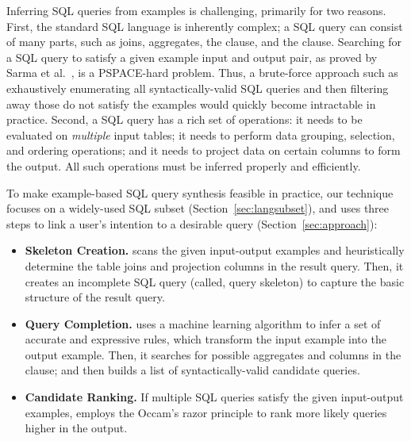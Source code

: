 Inferring SQL queries from examples is challenging,
primarily for two reasons. First, the standard SQL
language is inherently complex; a SQL query can consist
of many parts, such as joins, aggregates,
the  clause, and the  clause.
Searching for a SQL query
to satisfy a given example input and output pair,
as proved by Sarma et al.~\cite{DasSarma:2010},
is a PSPACE-hard problem. Thus,
a brute-force approach such as exhaustively
enumerating all
syntactically-valid SQL queries and then
filtering away those do not satisfy the examples
would quickly become intractable in practice. 
Second, a SQL query has a rich set of operations: it
needs to be evaluated on \textit{multiple} input tables;
it needs to perform data grouping, selection, and ordering
operations; and it needs to project data on certain columns to
form the output.
All such operations must be inferred properly and efficiently.%


To make example-based SQL query synthesis feasible in practice,
our \ourtool technique focuses on a widely-used SQL subset (Section~\ref{sec:langsubset}),
and uses three steps to link a user's intention to
a desirable query (Section~\ref{sec:approach}):



\begin{itemize}
\item \textbf{Skeleton Creation.} \ourtool scans the
given input-output examples and heuristically
determine the table joins and projection columns in
the result query. Then, it creates an
incomplete SQL query (called, query skeleton) to
capture the basic structure of the result query.

\item \textbf{Query Completion.} \ourtool
uses a machine learning algorithm to infer a set of accurate
and expressive rules, which transform the input
example into the output example. Then, it
searches for possible aggregates and columns in
the  clause; and then
builds a list of syntactically-valid candidate
queries. 


\item \textbf{Candidate Ranking.} If multiple SQL
queries satisfy the given input-output examples,
\ourtool employs the Occam's razor principle to
rank more likely queries higher in the output.
\end{itemize}

